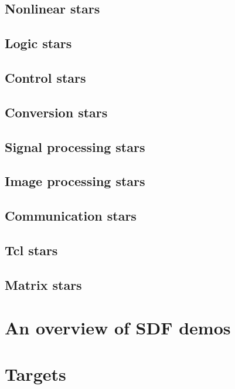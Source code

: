 \subsection{Nonlinear stars}
\label{SDF.Nonlinear.Stars}

\subsection{Logic stars}
\label{SDF.Logic.Stars}

\subsection{Control stars}
\label{SDF.Control.Stars}

\subsection{Conversion stars}
\label{SDF.Conversion.Stars}

\subsection{Signal processing stars}
\label{SDF.Signal.Processing.Stars}

\subsection{Image processing stars}
\label{SDF.Image.Processing.Stars}

\subsection{Communication stars}
\label{SDF.Communication.Stars}

\subsection{Tcl stars}
\label{SDF.Tcl.Stars}

\subsection{Matrix stars}
\label{SDF.Matrix.Stars}

\section{An overview of SDF demos}
\label{SDF.Demo.Overview}

\section{Targets}
\label{SDF.Targets}

